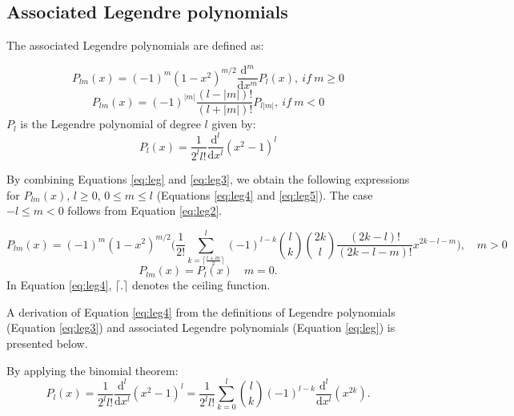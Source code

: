 \documentclass[12pt]{article}
\begin{document}
\begin{appendix}
\section{Associated Legendre polynomials}
\label{app:legendre}

The associated Legendre polynomials are defined as:

\begin{equation}
    \label{eq:leg}
    P_{lm}(x) = (-1)^m (1-x^2)^{m/2}  \frac{\mathrm{d}^m}{\mathrm{d}x^m} P_l(x), \ if \ m \ge 0
\end{equation}
\begin{equation}
    \label{eq:leg2}
    P_{lm} (x) = (-1)^{|m|} \frac{(l-|m|)!}{(l+|m|)!} P_{l|m|}, \ if \ m < 0
\end{equation}
$P_l$ is the Legendre polynomial of degree $l$ given by:
\begin{equation}
    \label{eq:leg3}
    P_l(x)=\frac{1}{2^l l!} \frac{\mathrm{d}^l}{\mathrm{d}x^l}(x^2-1)^l
\end{equation}

By combining Equations \ref{eq:leg} and \ref{eq:leg3}, we obtain the following expressions for $P_{lm}(x)$, $l \ge 0$, $0 \le m \le l$ (Equations \ref{eq:leg4} and \ref{eq:leg5}). The case $-l \le m <0$ follows from Equation \ref{eq:leg2}. 

\begin{equation}
    \label{eq:leg4}
    P_{lm}(x) = (-1)^m (1-x^2)^{m/2} \Bigg( \frac{1}{2!} \sum_{k=\lceil \frac{l+m}{2} \rceil}^l  (-1)^{l-k} {l \choose k} {2k \choose l} \frac{(2k-l)!}{(2k-l-m)!} x^{2k-l-m} \Bigg), \quad m >0
\end{equation}
\begin{equation}
    \label{eq:leg5}
    P_{lm}(x) = P_l(x)  \quad m = 0.
\end{equation} 
In Equation \ref{eq:leg4}, $\lceil . \rceil$ denotes the ceiling function.

    
A derivation of Equation \ref{eq:leg4} from the definitions of Legendre polynomials (Equation \ref{eq:leg3}) and associated Legendre polynomials (Equation \ref{eq:leg}) is presented below.

By applying the binomial theorem:
\begin{equation}
    \label{eq:fleg}
    P_l(x)= \frac{1}{2^l l!} \frac{\mathrm{d}^l}{\mathrm{d}x^l}(x^2-1)^l = \frac{1}{2^l l!} \sum_{k=0}^l {l \choose k} (-1)^{l-k} \frac{\mathrm{d}^l}{\mathrm{d}x^l}(x^{2k}).
\end{equation}


\end{appendix}
\end{document}
